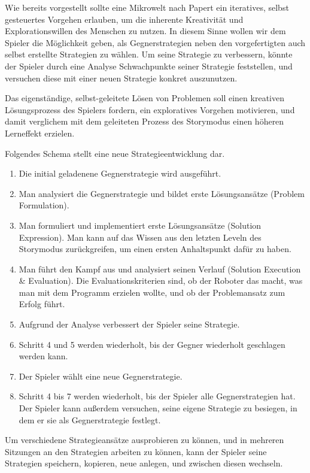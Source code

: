 Wie bereits vorgestellt sollte eine Mikrowelt nach Papert ein iteratives, selbst gesteuertes Vorgehen
erlauben, um die inherente Kreativität und Explorationswillen des Menschen zu nutzen. In diesem
Sinne wollen wir dem Spieler die Möglichkeit geben, als Gegnerstrategien neben den vorgefertigten
auch selbst erstellte Strategien zu wählen. Um seine Strategie zu verbessern, könnte der Spieler
durch eine Analyse Schwachpunkte seiner Strategie feststellen, und versuchen diese mit einer neuen
Strategie konkret auszunutzen.

Das eigenständige, selbst-geleitete Lösen von Problemen soll einen kreativen Lösungsprozess des
Spielers fordern, ein exploratives Vorgehen motivieren, und damit verglichem mit dem geleiteten
Prozess des Storymodus einen höheren Lerneffekt erzielen.

Folgendes Schema stellt eine neue Strategieentwicklung dar.

\begin{enumerate}
\item Die initial geladenene Gegnerstrategie wird ausgeführt.
\item Man analysiert die Gegnerstrategie und bildet erste Lösungsansätze (Problem Formulation).
\item Man formuliert und implementiert erste Lösungsansätze (Solution Expression). Man kann auf das Wissen aus den letzten
Leveln des Storymodus zurückgreifen, um einen ersten Anhaltspunkt dafür zu haben.
\item Man führt den Kampf aus und analysiert seinen Verlauf (Solution Execution \& Evaluation). Die Evaluationskriterien sind, ob der Roboter
das macht, was man mit dem Programm erzielen wollte, und ob der Problemansatz zum Erfolg führt.
\item Aufgrund der Analyse verbessert der Spieler seine Strategie.
\item Schritt 4 und 5 werden wiederholt, bis der Gegner wiederholt geschlagen werden kann.
\item Der Spieler wählt eine neue Gegnerstrategie.
\item Schritt 4 bis 7 werden wiederholt, bis der Spieler alle Gegnerstrategien hat. Der Spieler kann außerdem
versuchen, seine eigene Strategie zu besiegen, in dem er sie als Gegnerstrategie festlegt.
\end{enumerate}

Um verschiedene Strategieansätze ausprobieren zu können, und in mehreren Sitzungen an den Strategien
arbeiten zu können, kann der Spieler seine Strategien speichern, kopieren, neue anlegen, und
zwischen diesen wechseln.


